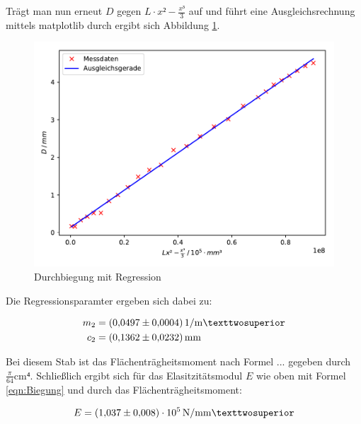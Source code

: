 Trägt man nun erneut $D$ gegen $L\cdot x²-\frac{x³}{3}$ auf und führt eine
Ausgleichsrechnung mittels matplotlib durch ergibt sich Abbildung \ref{fig:plot2}. 

\begin{figure}
  \centering
  \includegraphics[scale=0.8]{content/plot2.pdf}
  \caption{Durchbiegung mit Regression}
  \label{fig:plot2}
\end{figure}

Die Regressionsparamter ergeben sich dabei zu: 

\begin{align*}
m_2 &= \SI{0.0497+-0.0004}{1\per\meter²}\\ 
c_2 &= \SI{0.1362+-0.0232}{\milli\meter}
\end{align*}

Bei diesem Stab ist das Flächenträgheitsmoment nach Formel ... 
gegeben durch $\frac{\pi}{64} \si{\centi\meter⁴}$.
Schließlich ergibt sich für das Elasitzitätsmodul $E$ wie oben mit Formel 
\eqref{eqn:Biegung} und durch das Flächenträgheitsmoment:

\begin{equation*}
E = \SI{1.037+-0.008e5}{\newton\per\milli\meter²}
\end{equation*}
